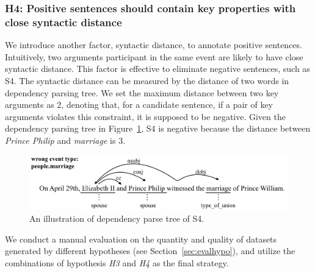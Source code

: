 \subsubsection{H4: Positive sentences should contain key properties with close syntactic distance}
We introduce another factor, syntactic distance, to annotate positive sentences. Intuitively, two arguments participant in the same event are likely to have close syntactic distance. This factor is effective to eliminate negative sentences, such as S4. The syntactic distance can be measured by the distance of two words in dependency parsing tree. We set the maximum distance between two key arguments as 2, denoting that, for a candidate sentence, if a pair of key arguments violates this constraint, it is supposed to be negative. Given the dependency parsing tree in Figure~\ref{fig:2}, S4 is negative because the distance between \emph{Prince Philip} and \emph{marriage} is 3.

\begin{figure}
	\includegraphics[width=.48\textwidth]{deppath}
	\caption{An illustration of dependency parse tree of S4. \label{fig:2}}
\end{figure}

We conduct a manual evaluation on the quantity and quality of  datasets generated by different hypotheses (see Section~\ref{sec:evalhypo}), and utilize the combinations of hypothesis \emph{H3} and \emph{H4} as the final strategy.